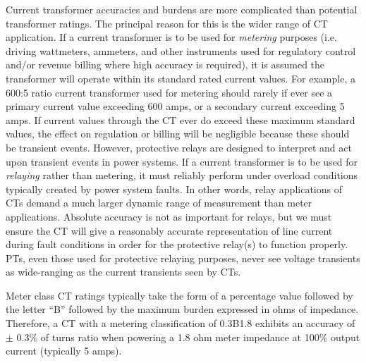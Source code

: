 Current transformer accuracies and burdens are more complicated than potential transformer ratings.  The principal reason for this is the wider range of CT application.  If a current transformer is to be used for \textit{metering} purposes (i.e. driving wattmeters, ammeters, and other instruments used for regulatory control and/or revenue billing where high accuracy is required), it is assumed the transformer will operate within its standard rated current values.  For example, a 600:5 ratio current transformer used for metering should rarely if ever see a primary current value exceeding 600 amps, or a secondary current exceeding 5 amps.  If current values through the CT ever do exceed these maximum standard values, the effect on regulation or billing will be negligible because these should be transient events.  However, protective relays are designed to interpret and act upon transient events in power systems.  If a current transformer is to be used for \textit{relaying} rather than metering, it must reliably perform under overload conditions typically created by power system faults.  In other words, relay applications of CTs demand a much larger dynamic range of measurement than meter applications.  Absolute accuracy is not as important for relays, but we must ensure the CT will give a reasonably accurate representation of line current during fault conditions in order for the protective relay(s) to function properly.  PTs, even those used for protective relaying purposes, never see voltage transients as wide-ranging as the current transients seen by CTs.

\vskip 10pt

Meter class CT ratings typically take the form of a percentage value followed by the letter ``B'' followed by the maximum burden expressed in ohms of impedance.  Therefore, a CT with a metering classification of 0.3B1.8 exhibits an accuracy of $\pm$ 0.3\% of turns ratio when powering a 1.8 ohm meter impedance at 100\% output current (typically 5 amps).

\vskip 10pt


